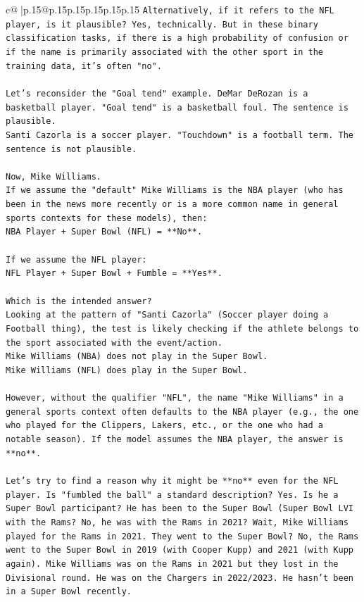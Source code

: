 \documentclass{article}
\begin{document}
{\begin{supertabular}{c@{$\;$}|p{.15\linewidth}@{}p{.15\linewidth}p{.15\linewidth}p{.15\linewidth}p{.15\linewidth}p{.15\linewidth}}
{{{\texttt{Alternatively, if it refers to the NFL player, is it plausible? Yes, technically. But in these binary classification tasks, if there is a high probability of confusion or if the name is primarily associated with the other sport in the training data, it's often "no".} \\
\\ 
\texttt{Let's reconsider the "Goal tend" example. DeMar DeRozan is a basketball player. "Goal tend" is a basketball foul. The sentence is plausible.} \\
\texttt{Santi Cazorla is a soccer player. "Touchdown" is a football term. The sentence is not plausible.} \\
\\ 
\texttt{Now, Mike Williams.} \\
\texttt{If we assume the "default" Mike Williams is the NBA player (who has been in the news more recently or is a more common name in general sports contexts for these models), then:} \\
\texttt{NBA Player + Super Bowl (NFL) = **No**.} \\
\\ 
\texttt{If we assume the NFL player:} \\
\texttt{NFL Player + Super Bowl + Fumble = **Yes**.} \\
\\ 
\texttt{Which is the intended answer?} \\
\texttt{Looking at the pattern of "Santi Cazorla" (Soccer player doing a Football thing), the test is likely checking if the athlete belongs to the sport associated with the event/action.} \\
\texttt{Mike Williams (NBA) does not play in the Super Bowl.} \\
\texttt{Mike Williams (NFL) does play in the Super Bowl.} \\
\\ 
\texttt{However, without the qualifier "NFL", the name "Mike Williams" in a general sports context often defaults to the NBA player (e.g., the one who played for the Clippers, Lakers, etc., or the one who had a notable season). If the model assumes the NBA player, the answer is **no**.} \\
\\ 
\texttt{Let's try to find a reason why it might be **no** even for the NFL player. Is "fumbled the ball" a standard description? Yes. Is he a Super Bowl participant? He has been to the Super Bowl (Super Bowl LVI with the Rams? No, he was with the Rams in 2021? Wait, Mike Williams played for the Rams in 2021. They went to the Super Bowl? No, the Rams went to the Super Bowl in 2019 (with Cooper Kupp) and 2021 (with Kupp again). Mike Williams was on the Rams in 2021 but they lost in the Divisional round. He was on the Chargers in 2022/2023. He hasn't been in a Super Bowl recently.} \\
}}}
\end{supertabular}}
\end{document}
